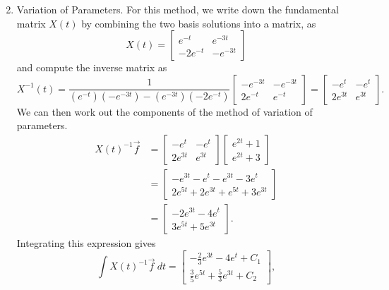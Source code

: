 \begin{exampleSol}
\begin{enumerate}[1.]
\begin{equation}
\end{equation}
\item Variation of Parameters. For this method, we write down the fundamental matrix $X(t)$ by combining the two basis solutions into a matrix, as
\begin{equation*}
X(t) = \begin{bmatrix} e^{-t} & e^{-3t} \\ -2e^{-t} & -e^{-3t} \end{bmatrix}
\end{equation*}
and compute the inverse matrix as
\begin{equation*}
X^{-1}(t) = \frac{1}{(e^{-t})(-e^{-3t}) - (e^{-3t})(-2e^{-t})}\begin{bmatrix} -e^{-3t} & -e^{-3t} \\ 2e^{-t} & e^{-t} \end{bmatrix} = \begin{bmatrix} -e^{t} & -e^{t} \\ 2e^{3t} & e^{3t} \end{bmatrix}.
\end{equation*}
We can then work out the components of the method of variation of parameters.
\begin{equation*}
\begin{split}
X(t)^{-1}\vec{f} &= \begin{bmatrix} -e^{t} & -e^{t} \\ 2e^{3t} & e^{3t} \end{bmatrix}  \begin{bmatrix} e^{2t} + 1 \\ e^{2t} + 3 \end{bmatrix} \\
&= \begin{bmatrix} -e^{3t} - e^{t} - e^{3t} - 3e^{t} \\ 2e^{5t} + 2e^{3t} + e^{5t} + 3e^{3t} \end{bmatrix} \\
&= \begin{bmatrix} -2e^{3t} - 4e^{t} \\ 3e^{5t} + 5e^{3t} \end{bmatrix}.
\end{split}
\end{equation*}
Integrating this expression gives
\begin{equation*}
\int X(t)^{-1}\vec{f}\ dt = \begin{bmatrix} -\frac{2}{3}e^{3t} - 4e^t + C_1 \\ \frac{3}{5}e^{5t} + \frac{5}{3}e^{3t} + C_2 \end{bmatrix},

\end{equation*}
\end{enumerate}
\end{exampleSol}
